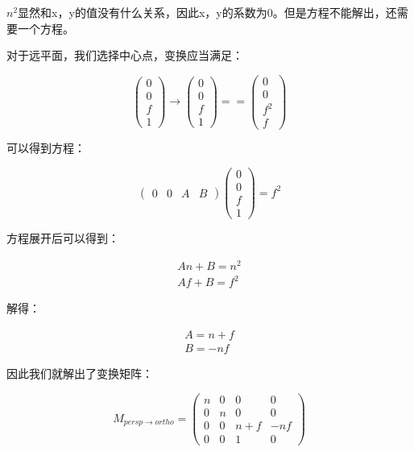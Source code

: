 \documentclass[openany]{progbookcn}
\begin{document}
$n^2$显然和x，y的值没有什么关系，因此x，y的系数为0。但是方程不能解出，还需要一个方程。

对于远平面，我们选择中心点，变换应当满足：

\begin{equation}
	\begin{pmatrix}0\\0\\f\\1\end{pmatrix}\rightarrow\begin{pmatrix}0\\0\\f\\1\end{pmatrix}==\begin{pmatrix}0\\0\\f^2\\f\end{pmatrix}
\end{equation}

可以得到方程：

\begin{equation}
	\begin{pmatrix}0&0&A&B\end{pmatrix}\begin{pmatrix}0\\0\\f\\1\end{pmatrix}=f^2
\end{equation}

方程展开后可以得到：

\begin{equation}
	\begin{split}
		An+B=n^2\\
		Af+B=f^2
	\end{split}
\end{equation}

解得：

\begin{equation}
	\begin{split}
		A=n+f\\
		B=-nf
	\end{split}
\end{equation}

因此我们就解出了变换矩阵：

\begin{equation}
	M_{persp\rightarrow ortho}=\begin{pmatrix}n&0&0&0\\0&n&0&0\\0&0&n+f&-nf\\0&0&1&0\end{pmatrix}
\end{equation}
\end{document}
